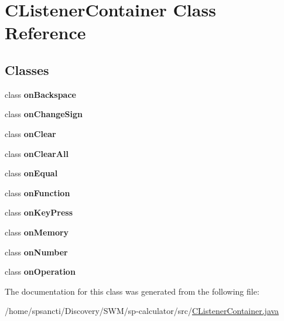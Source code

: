 \hypertarget{class_c_listener_container}{}\section{C\+Listener\+Container Class Reference}
\label{class_c_listener_container}
\subsection*{Classes}
\begin{DoxyCompactItemize}
\item 
class {\bfseries on\+Backspace}
\item 
class {\bfseries on\+Change\+Sign}
\item 
class {\bfseries on\+Clear}
\item 
class {\bfseries on\+Clear\+All}
\item 
class {\bfseries on\+Equal}
\item 
class {\bfseries on\+Function}
\item 
class {\bfseries on\+Key\+Press}
\item 
class {\bfseries on\+Memory}
\item 
class {\bfseries on\+Number}
\item 
class {\bfseries on\+Operation}
\end{DoxyCompactItemize}


The documentation for this class was generated from the following file\+:\begin{DoxyCompactItemize}
\item 
/home/spsancti/\+Discovery/\+S\+W\+M/sp-\/calculator/src/\hyperlink{_c_listener_container_8java}{C\+Listener\+Container.\+java}\end{DoxyCompactItemize}
